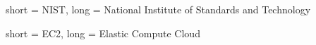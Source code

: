  {
    short = NIST,
    long = National Institute of Standards and Technology
}

 {
    short = EC2,
    long = Elastic Compute Cloud
}
